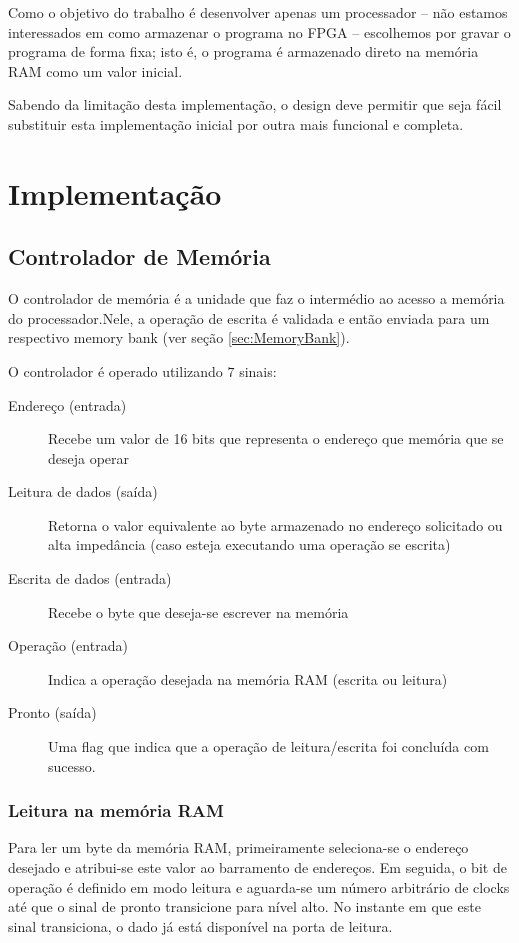 \documentclass[11pt]{report}
\begin{document}
Como o objetivo do trabalho é desenvolver apenas um processador -- não estamos interessados em como armazenar o programa no FPGA -- escolhemos por gravar o programa de forma fixa; isto é, o programa é armazenado direto na memória RAM como um valor inicial.

Sabendo da limitação desta implementação, o design deve permitir que seja fácil substituir esta implementação inicial por outra mais funcional e completa.

\chapter{Implementação}

\section{Controlador de Memória}
\label{sec:MemoryController}
O controlador de memória é a unidade que faz o intermédio ao acesso a memória do processador.Nele, a operação de escrita é validada e então enviada para um respectivo memory bank (ver seção \ref{sec:MemoryBank}).

O controlador é operado utilizando $7$ sinais:

\begin{description}
	\item[Endereço (entrada)] Recebe um valor de 16 bits que representa o endereço que memória que se deseja operar
	\item[Leitura de dados (saída)] Retorna o valor equivalente ao byte armazenado no endereço solicitado ou alta impedância (caso esteja executando uma operação se escrita)
	\item[Escrita de dados (entrada)] Recebe o byte que deseja-se escrever na memória
	\item[Operação (entrada)] Indica a operação desejada na memória RAM (escrita ou leitura)
	\item[Pronto (saída)] Uma flag que indica que a operação de leitura/escrita foi concluída com sucesso.
\end{description}

\subsection{Leitura na memória RAM}
\label{MemoryRead}
Para ler um byte da memória RAM, primeiramente seleciona-se o endereço desejado e atribui-se este valor ao barramento de endereços. Em seguida, o bit de operação é definido em modo leitura e aguarda-se um número arbitrário de clocks até que o sinal de pronto transicione para nível alto. No instante em que este sinal transiciona, o dado já está disponível na porta de leitura.
\end{document}
